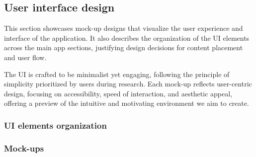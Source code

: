 \documentclass{article}
\begin{document}
\subsection{User interface design}

This section showcases mock-up designs that visualize the user experience and interface of the application.
It also describes the organization of the UI elements across the main app sections, justifying design decisions for content placement and user flow.

The UI is crafted to be minimalist yet engaging, following the principle of simplicity prioritized by users during research.
Each mock-up reflects user-centric design, focusing on accessibility, speed of interaction, and aesthetic appeal, offering a preview of the intuitive and motivating environment we aim to create.

\subsubsection{UI elements organization}


\subsubsection{Mock-ups}


\end{document}
